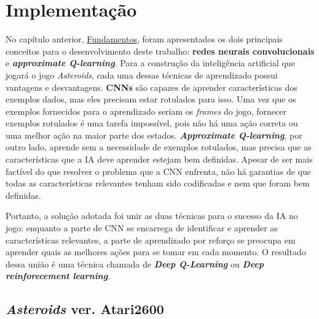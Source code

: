 

\chapter{Implementação}
\label{cap:implementacao}

No capítulo anterior, \hyperref[cap:fundamentos]{Fundamentos}, foram apresentados os dois principais conceitos para o desenvolvimento deste trabalho: \textbf{redes neurais convolucionais} e \textbf{\textit{approximate Q-learning}}.
Para a construção da inteligência artificial que jogará o jogo \textit{Asteroids}, cada uma dessas técnicas de aprendizado possui vantagens e desvantagens.
\textbf{CNNs} são capazes de aprender características dos exemplos dados, mas eles precisam estar rotulados para isso. Uma vez que os exemplos fornecidos para o aprendizado seriam os \textit{frames} do jogo, fornecer exemplos rotulados é uma tarefa impossível, pois não há uma ação correta ou uma melhor ação na maior parte dos estados.
\textbf{\textit{Approximate Q-learning}}, por outro lado, aprende sem a necessidade de exemplos rotulados, mas precisa que as características que a IA deve aprender estejam bem definidas. Apesar de ser mais factível do que resolver o problema que a CNN enfrenta, não há garantias de que todas as características relevantes tenham sido codificadas e nem que foram bem definidas.

Portanto, a solução adotada foi unir as duas técnicas para o sucesso da IA no jogo: enquanto a parte de CNN se encarrega de identificar e aprender as características relevantes, a parte de aprendizado por reforço se preocupa em aprender quais as melhores ações para se tomar em cada momento. O resultado dessa união é uma técnica chamada de \textbf{\textit{Deep Q-Learning}} ou \textbf{\textit{Deep reinforecement learning}}.

\section{\textit{Asteroids} ver. Atari2600}
\label{sec:aa2600}

